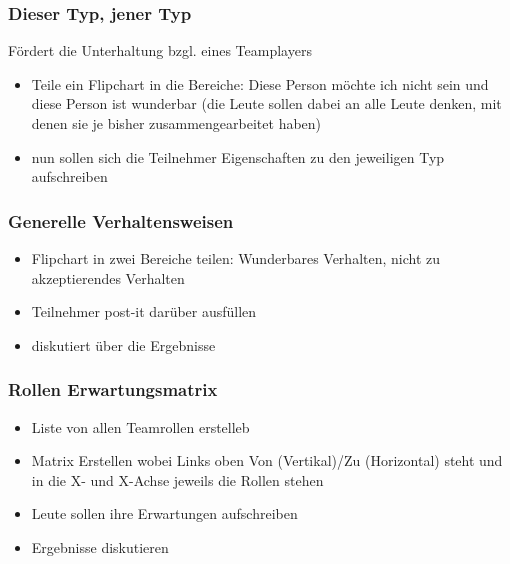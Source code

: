 \subsubsection{Dieser Typ, jener Typ}
Fördert die Unterhaltung bzgl. eines Teamplayers

\begin{itemize}
  \item Teile ein Flipchart in die Bereiche: Diese Person möchte ich nicht sein und diese Person
    ist wunderbar (die Leute sollen dabei an alle Leute denken, mit denen sie je bisher
    zusammengearbeitet haben)
  \item nun sollen sich die Teilnehmer Eigenschaften zu den jeweiligen Typ aufschreiben
\end{itemize}


\subsubsection{Generelle Verhaltensweisen}
\begin{itemize}
  \item Flipchart in zwei Bereiche teilen: Wunderbares Verhalten,  nicht zu akzeptierendes
    Verhalten
  \item Teilnehmer post-it darüber ausfüllen
  \item diskutiert über die Ergebnisse
\end{itemize}

\subsubsection{Rollen Erwartungsmatrix}
\begin{itemize}
  \item Liste von allen Teamrollen erstelleb
  \item Matrix Erstellen wobei Links oben Von (Vertikal)/Zu (Horizontal) steht und in die X-
    und X-Achse jeweils die Rollen stehen
  \item Leute sollen ihre Erwartungen aufschreiben
  \item Ergebnisse diskutieren
\end{itemize}

